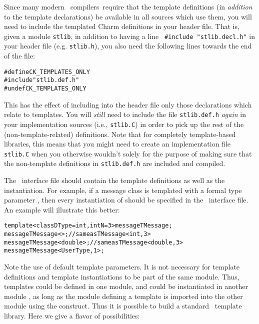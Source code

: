 Since many modern \CC\ compilers\longcompilerfootnote\ require that
the template definitions (in \emph{addition} to the template
declarations) be available in all sources which use them, you will
need to include the templated Charm definitions in your header file.
That is, given a module {\tt stlib}, in addition to having a line {\tt
  \#include "stlib.decl.h"} in your header file (e.g. {\tt stlib.h}),
you also need the following lines towards the end of the file:

\begin{alltt}
#define CK_TEMPLATES_ONLY
#include "stlib.def.h"
#undef CK_TEMPLATES_ONLY
\end{alltt}

This has the effect of including into the header file only those
declarations which relate to templates.  You will \emph{still} need to
include the file {\tt stlib.def.h} \emph{again} in your implementation
sources (i.e., {\tt stlib.C}) in order to pick up the rest of the
(non-template-related) definitions.  Note that for completely
template-based libraries, this means that you might need to create an
implementation file {\tt stlib.C} when you otherwise wouldn't solely
for the purpose of making sure that the non-template definitions in
{\tt stlib.def.h} are included and compiled.

The \charmpp\ interface file should contain the template
definitions as well as the instantiation. For example, if a message
class  is templated with a formal type parameter 
, then every instantiation of  should be specified
in the \charmpp\ interface file. An example will illustrate this better:

\begin{alltt}
  template <class DType=int, int N=3> message TMessage;
  message TMessage<>; // same as TMessage<int,3>
  message TMessage<double>; // same as TMessage<double, 3>
  message TMessage<UserType, 1>;
\end{alltt}

Note the use of default template parameters. It is not necessary for
template definitions and template instantiations to be part of the
same module.  Thus, templates could be defined in one module, and
could be instantiated in another module , as long as the
module defining a template is imported into the other module using the
 construct. Thus it is possible to build a standard
\charmpp\ template library. Here we give a flavor of possibilities:

